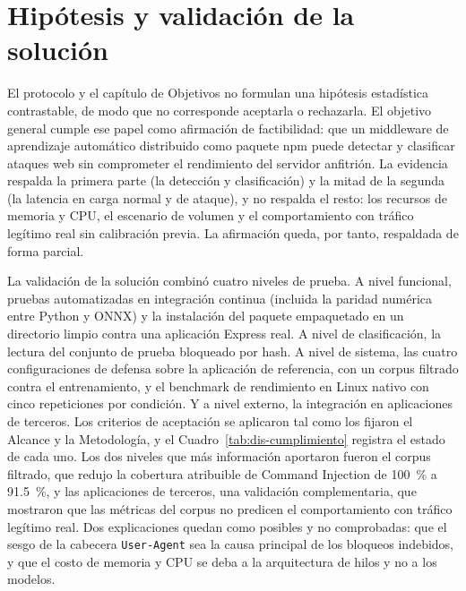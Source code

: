 \section{Hipótesis y validación de la solución}
\label{sec:dis-validacion}

El protocolo y el capítulo de Objetivos no formulan una hipótesis estadística contrastable, de
modo que no corresponde aceptarla o rechazarla. El objetivo general cumple ese papel como
afirmación de factibilidad: que un middleware de aprendizaje automático distribuido como paquete
npm puede detectar y clasificar ataques web sin comprometer el rendimiento del servidor anfitrión.
La evidencia respalda la primera parte (la detección y clasificación) y la mitad de la segunda
(la latencia en carga normal y de ataque), y no respalda el resto: los recursos de memoria y CPU,
el escenario de volumen y el comportamiento con tráfico legítimo real sin calibración previa. La
afirmación queda, por tanto, respaldada de forma parcial.

La validación de la solución combinó cuatro niveles de prueba. A nivel funcional, pruebas
automatizadas en integración continua (incluida la paridad numérica entre Python y ONNX) y la
instalación del paquete empaquetado en un directorio limpio contra una aplicación Express real.
A nivel de clasificación, la lectura del conjunto de prueba bloqueado por hash. A nivel de sistema,
las cuatro configuraciones de defensa sobre la aplicación de referencia, con un corpus filtrado
contra el entrenamiento, y el benchmark de rendimiento en Linux nativo con cinco repeticiones por
condición. Y a nivel externo, la integración en aplicaciones de terceros. Los criterios de
aceptación se aplicaron tal como los fijaron el Alcance y la Metodología, y el
Cuadro~\ref{tab:dis-cumplimiento} registra el estado de cada uno. Los dos niveles que más
información aportaron fueron el corpus
filtrado, que redujo la cobertura atribuible de Command Injection de 100~\% a 91.5~\%, y las
aplicaciones de terceros, una validación complementaria, que mostraron que las métricas del corpus no predicen el comportamiento
con tráfico legítimo real. Dos explicaciones quedan como posibles y no comprobadas: que el sesgo de
la cabecera \texttt{User-Agent} sea la causa principal de los bloqueos indebidos, y que el costo de
memoria y CPU se deba a la arquitectura de hilos y no a los modelos.

